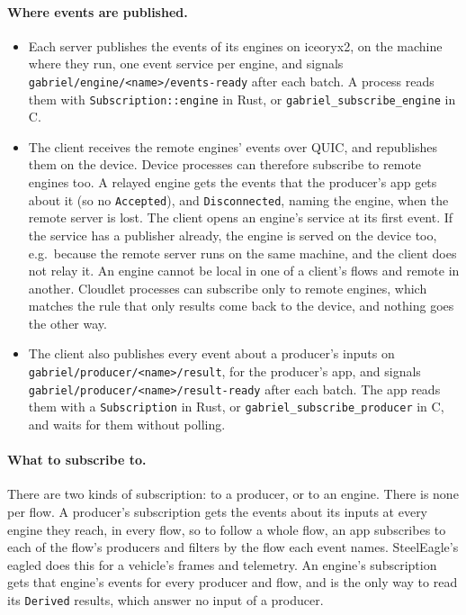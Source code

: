 \documentclass[11pt]{article}
\newcommand{\code}[1]{\texttt{#1}}
\begin{document}
\paragraph{Where events are published.}
\begin{itemize}[nosep]
  \item Each server publishes the events of its engines on iceoryx2, on the
        machine where they run, one event service per engine, and signals
        \nolinkurl{gabriel/engine/<name>/events-ready} after each batch. A
        process reads them with \code{Subscription::engine} in Rust, or
        \code{gabriel\_subscribe\_engine} in C.
  \item The client receives the remote engines' events over QUIC, and
        republishes them on the device. Device processes can therefore
        subscribe to remote engines too. A relayed engine gets the events that
        the producer's app gets about it (so no \code{Accepted}), and
        \code{Disconnected}, naming the engine, when the remote server is
        lost. The client opens an engine's service at its first event. If the
        service has a publisher already, the engine is served on the device
        too, e.g.\ because the remote server runs on the same machine, and the
        client does not relay it. An engine cannot be local in one of a
        client's flows and remote in another. Cloudlet processes can subscribe only
        to remote engines, which matches the rule that only results come back
        to the device, and nothing goes the other way.
  \item The client also publishes every event about a producer's inputs on
        \nolinkurl{gabriel/producer/<name>/result}, for the producer's app,
        and signals \nolinkurl{gabriel/producer/<name>/result-ready} after
        each batch. The app reads them with a \code{Subscription} in Rust, or
        \code{gabriel\_subscribe\_producer} in C, and waits for them without
        polling.
\end{itemize}

\paragraph{What to subscribe to.} There are two kinds of subscription: to a
producer, or to an engine. There is none per flow. A producer's subscription
gets the events about its inputs at every engine they reach, in every flow, so
to follow a whole flow, an app subscribes to each of the flow's producers and
filters by the flow each event names. SteelEagle's eagled does this for a
vehicle's frames and telemetry. An engine's subscription gets that engine's
events for every producer and flow, and is the only way to read its
\code{Derived} results, which answer no input of a producer.
\end{document}
